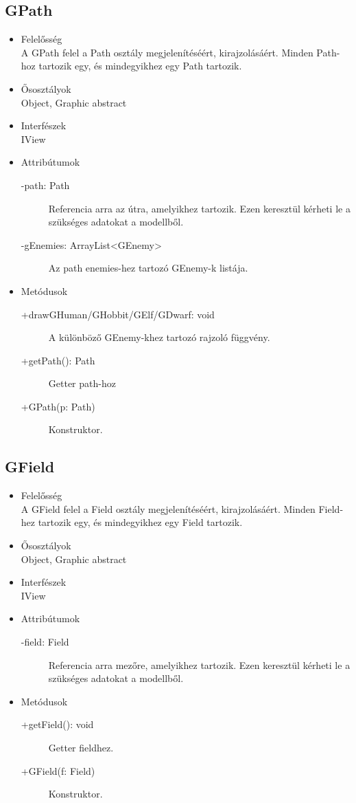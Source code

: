 \subsection{GPath}
\begin{itemize}
\item Felelősség\\
A GPath felel a Path osztály megjelenítéséért, kirajzolásáért. Minden Path-hoz tartozik egy, és mindegyikhez egy Path tartozik.
\item Ősosztályok\\
Object, Graphic abstract
\item Interfészek\\
IView
\item Attribútumok\\
	\begin{description}
		\item[-path: Path] Referencia arra az útra, amelyikhez tartozik. Ezen keresztül kérheti le a szükséges adatokat a modellből.
		\item[-gEnemies: ArrayList<GEnemy>] Az path enemies-hez tartozó GEnemy-k listája.
\end{description}
\item Metódusok\\
	\begin{description}
		\item[+drawGHuman/GHobbit/GElf/GDwarf: void] A különböző GEnemy-khez tartozó rajzoló függvény.
		\item[+getPath(): Path] Getter path-hoz
		\item[+GPath(p: Path)] Konstruktor.
	\end{description}
\end{itemize}

\subsection{GField}
\begin{itemize}
\item Felelősség\\
A GField felel a Field osztály megjelenítéséért, kirajzolásáért. Minden Field-hez tartozik egy, és mindegyikhez egy Field tartozik.
\item Ősosztályok\\
Object, Graphic abstract
\item Interfészek\\
IView
\item Attribútumok\\
	\begin{description}
		\item[-field: Field] Referencia arra  mezőre, amelyikhez tartozik. Ezen keresztül kérheti le a szükséges adatokat a modellből.
\end{description}
\item Metódusok\\
	\begin{description}
		\item[+getField(): void] Getter fieldhez.
		\item[+GField(f: Field)] Konstruktor.
	\end{description}
\end{itemize}

